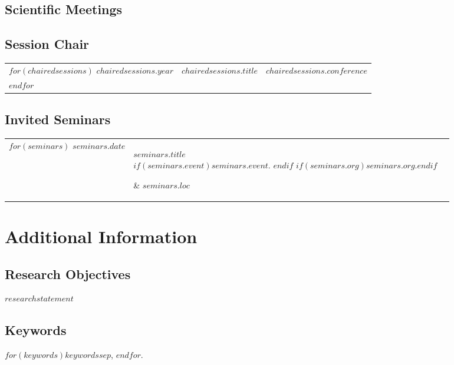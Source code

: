 \documentclass[12pt, martgin, line]{article}
\begin{document}
\subsection*{Scientific Meetings}

\begin{enumerate}
  
\end{enumerate}

\subsection*{Session Chair}

\setlength{\extrarowheight}{.25em}
\begin{longtable}[l]{lll}
  $for(chairedsessions)$
  $chairedsessions.year$&
  $chairedsessions.title$&
  $chairedsessions.conference$\\
  $endfor$
\end{longtable}
\setlength{\extrarowheight}{0em}

\subsection*{Invited Seminars}

\setlength{\extrarowheight}{.75em}
\begin{longtable}[l]{lp{3.75in}l}
  $for(seminars)$
  $seminars.date$&
  \parbox[t]{3.75in} { $seminars.title$\\
    \scriptsize{%
      $if(seminars.event)$\textit{$seminars.event$}. $endif$%
      $if(seminars.org)$$seminars.org$.$endif$%
    }} & $seminars.loc$\\
  $endfor$
\end{longtable}
\setlength{\extrarowheight}{0em}

\section*{Additional Information}

\subsection*{Research Objectives}

$researchstatement$

\subsection*{Keywords}

$for(keywords)$$keywords$$sep$, $endfor$.
\end{document}
